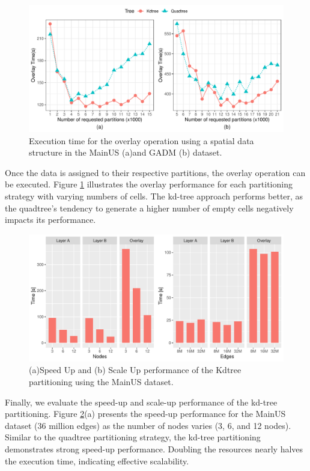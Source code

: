 \begin{figure}
    \centering
    \includegraphics[width=\textwidth]{chapterExtension/K/K_Overlay} 
    \caption{Execution time for the overlay operation using a spatial data structure in the MainUS (a)and GADM (b) dataset.} \label{fig:k_overlay_us}
\end{figure}

Once the data is assigned to their respective partitions, the overlay operation can be executed.  Figure \ref{fig:k_overlay_us} illustrates the overlay performance for each partitioning strategy with varying numbers of cells. The kd-tree approach performs better, as the quadtree’s tendency to generate a higher number of empty cells negatively impacts its performance.

\begin{figure}
    \centering
    \includegraphics[width=\textwidth]{chapterExtension/K_SS/K_SS}
    \caption{(a)Speed Up and (b) Scale Up performance of the Kdtree partitioning using the MainUS dataset.} \label{fig:k_scale_speed_us}
\end{figure}

Finally, we evaluate the speed-up and scale-up performance of the kd-tree partitioning. Figure \ref{fig:k_scale_speed_us}(a) presents the speed-up performance for the MainUS dataset (36 million edges) as the number of nodes varies (3, 6, and 12 nodes). Similar to the quadtree partitioning strategy, the kd-tree partitioning demonstrates strong speed-up performance. Doubling the resources nearly halves the execution time, indicating effective scalability.

